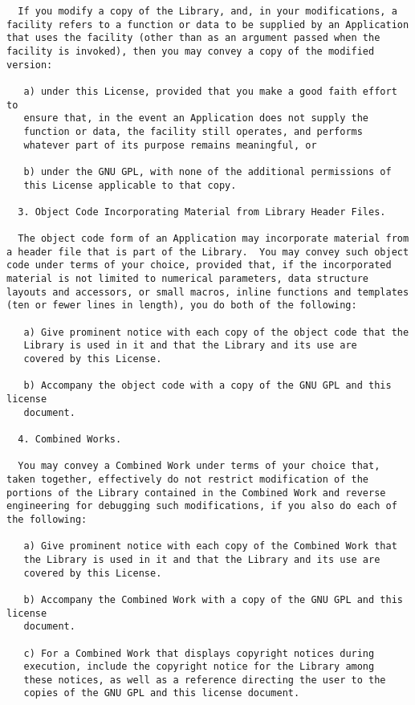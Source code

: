 \documentclass[a4paper]{article}
\begin{document}
\begin{verbatim}
  If you modify a copy of the Library, and, in your modifications, a
facility refers to a function or data to be supplied by an Application
that uses the facility (other than as an argument passed when the
facility is invoked), then you may convey a copy of the modified
version:

   a) under this License, provided that you make a good faith effort to
   ensure that, in the event an Application does not supply the
   function or data, the facility still operates, and performs
   whatever part of its purpose remains meaningful, or

   b) under the GNU GPL, with none of the additional permissions of
   this License applicable to that copy.

  3. Object Code Incorporating Material from Library Header Files.

  The object code form of an Application may incorporate material from
a header file that is part of the Library.  You may convey such object
code under terms of your choice, provided that, if the incorporated
material is not limited to numerical parameters, data structure
layouts and accessors, or small macros, inline functions and templates
(ten or fewer lines in length), you do both of the following:

   a) Give prominent notice with each copy of the object code that the
   Library is used in it and that the Library and its use are
   covered by this License.

   b) Accompany the object code with a copy of the GNU GPL and this license
   document.

  4. Combined Works.

  You may convey a Combined Work under terms of your choice that,
taken together, effectively do not restrict modification of the
portions of the Library contained in the Combined Work and reverse
engineering for debugging such modifications, if you also do each of
the following:

   a) Give prominent notice with each copy of the Combined Work that
   the Library is used in it and that the Library and its use are
   covered by this License.

   b) Accompany the Combined Work with a copy of the GNU GPL and this license
   document.

   c) For a Combined Work that displays copyright notices during
   execution, include the copyright notice for the Library among
   these notices, as well as a reference directing the user to the
   copies of the GNU GPL and this license document.


\end{verbatim}
\end{document}
